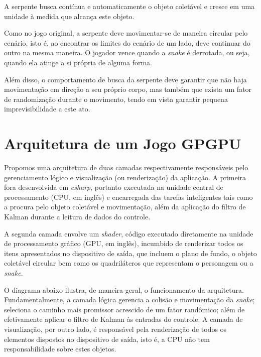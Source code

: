 \documentclass[conference]{IEEEtran}
\begin{document}
A serpente busca contínua e automaticamente o objeto coletável e cresce em uma unidade à medida que alcança este objeto.

Como no jogo original, a serpente deve movimentar-se de maneira circular pelo cenário, isto é, ao encontrar os limites do cenário de um lado, deve continuar do outro na mesma maneira. O jogador vence quando a \textit{snake} é derrotada, ou seja, quando ela atinge a si própria de alguma forma.

Além disso, o comportamento de busca da serpente deve garantir que não haja movimentação em direção a seu próprio corpo, mas também que exista um fator de randomização durante o movimento, tendo em vista garantir pequena imprevisibilidade a este ato.


\section{Arquitetura de um Jogo GPGPU}

Propomos uma arquitetura de duas camadas respectivamente responsáveis pelo gerenciamento lógico e visualização (ou renderização) da aplicação. A primeira fora desenvolvida em \textit{csharp}, portanto executada na unidade central de processamento (CPU, em inglês) e encarregada das tarefas inteligentes tais como a procura pelo objeto coletável e movimentação, além da aplicação do filtro de Kalman durante a leitura de dados do controle.

A segunda camada envolve um \textit{shader}, código executado diretamente na unidade de processamento gráfico (GPU, em inglês), incumbido de renderizar todos os itens apresentados no dispositivo de saída, que incluem o plano de fundo, o objeto coletável circular bem como os quadriláteros que representam o personagem ou a \textit{snake}.

O diagrama abaixo ilustra, de maneira geral, o funcionamento da arquitetura. Fundamentalmente, a camada lógica gerencia a colisão e movimentação da \textit{snake}; seleciona o caminho mais promissor acrescido de um fator randômico; além de efetivamente aplicar o filtro de Kalman às entradas do controle. A camada de visualização, por outro lado, é responsável pela renderização de todos os elementos dispostos no dispositivo de saída, isto é, a CPU não tem responsabilidade sobre estes objetos.
\end{document}
